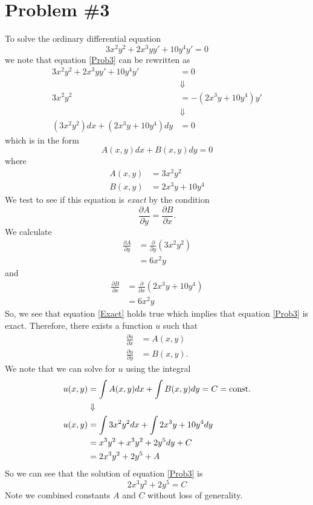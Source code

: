 \documentclass[11pt]{article}
\numberwithin{equation}{section}
\begin{document}
\section{Problem \#3}
To solve the ordinary differential equation
\begin{equation}
3x^2y^2 + 2x^3yy' + 10y^4y' = 0
\label{Prob3}
\end{equation}
we note that equation \ref{Prob3} can be rewritten as
\begin{align*}
3x^2y^2 + 2x^3yy' + 10y^4y' &= 0\\
&\Downarrow\\
3x^2y^2 &=  -(2x^3y + 10y^4)y'\\
&\Downarrow\\
(3x^2y^2)dx + (2x^3y + 10y^4)dy &= 0
\end{align*}
which is in the form
$$A(x,y)dx + B(x,y)dy = 0$$
where
\begin{align*}
A(x,y) &= 3x^2y^2 \\
B(x,y) &= 2x^3y + 10y^4 
\end{align*}
We test to see if this equation is \emph{exact} by the condition
\begin{equation}
\frac{\partial A}{\partial y} = \frac{\partial B}{\partial x}.
\label{Exact}
\end{equation}
We calculate 
\begin{align*}
\frac{\partial A}{\partial y} &= \frac{\partial}{\partial y}(3x^2y^2)\\
&= 6x^2y
\end{align*}
and
\begin{align*}
\frac{\partial B}{\partial x} &= \frac{\partial}{\partial x}(2x^3y + 10y^4)\\
&= 6x^2y
\end{align*}
So, we see that equation \ref{Exact} holds true which implies that equation \ref{Prob3} is 
exact. Therefore, there exists a function $u$ such that
\begin{align*}
\frac{\partial u}{\partial x} &= A(x,y)\\
\frac{\partial u}{\partial y} &= B(x,y).
\end{align*}
We note that we can solve for $u$ using the integral
\begin{align*}
u(x,y) &= \int A(x,y)dx + \int B(x,y)dy = C = \textnormal{const.}\\
&\Downarrow\\
u(x,y) &= \int 3x^2y^2dx + \int 2x^3y+10y^4dy\\
&= x^3y^2 + x^3y^2+2y^5dy + C\\
&=  2x^3y^2+2y^5 + A
\end{align*}
So we can see that the solution of equation \ref{Prob3} is 
$$2x^3y^2+2y^5 = C$$
Note we combined constants $A$ and $C$ without loss of generality.
\end{document}
